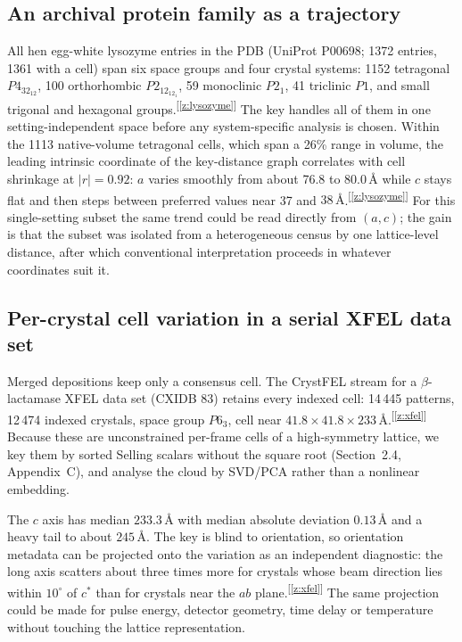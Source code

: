 \documentclass[11pt]{article}
\newcommand{\Ang}{\text{\AA}}
\newcommand{\chk}[1]{\textsuperscript{[\ref{#1}]}}
\begin{document}
\subsection{An archival protein family as a trajectory}

All hen egg-white lysozyme entries in the PDB (UniProt P00698; 1372 entries, 1361 with a cell) span six space groups and four crystal systems: 1152 tetragonal $P4_32_12$, 100 orthorhombic $P2_12_12_1$, 59 monoclinic $P2_1$, 41 triclinic $P1$, and small trigonal and hexagonal groups.\chk{z:lysozyme} The key handles all of them in one setting-independent space before any system-specific analysis is chosen. Within the 1113 native-volume tetragonal cells, which span a 26\% range in volume, the leading intrinsic coordinate of the key-distance graph correlates with cell shrinkage at $|r|=0.92$: $a$ varies smoothly from about 76.8 to $80.0\,\Ang$ while $c$ stays flat and then steps between preferred values near 37 and $38\,\Ang$.\chk{z:lysozyme} For this single-setting subset the same trend could be read directly from $(a,c)$; the gain is that the subset was isolated from a heterogeneous census by one lattice-level distance, after which conventional interpretation proceeds in whatever coordinates suit it.

\subsection{Per-crystal cell variation in a serial XFEL data set}

Merged depositions keep only a consensus cell. The CrystFEL stream for a $\beta$-lactamase XFEL data set (CXIDB 83) retains every indexed cell: 14\,445 patterns, 12\,474 indexed crystals, space group $P6_3$, cell near $41.8\times41.8\times233\,\Ang$.\chk{z:xfel} Because these are unconstrained per-frame cells of a high-symmetry lattice, we key them by sorted Selling scalars without the square root (Section~2.4, Appendix~C), and analyse the cloud by SVD/PCA rather than a nonlinear embedding.

The $c$ axis has median $233.3\,\Ang$ with median absolute deviation $0.13\,\Ang$ and a heavy tail to about $245\,\Ang$. The key is blind to orientation, so orientation metadata can be projected onto the variation as an independent diagnostic: the long axis scatters about three times more for crystals whose beam direction lies within $10^\circ$ of $c^*$ than for crystals near the $ab$ plane.\chk{z:xfel} The same projection could be made for pulse energy, detector geometry, time delay or temperature without touching the lattice representation.
\end{document}
